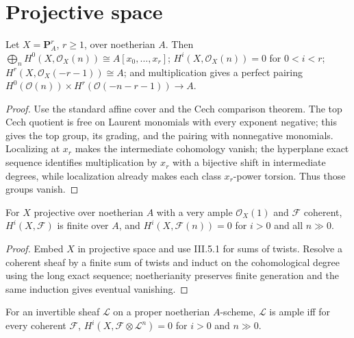 \section{Projective space}
\label{ha-ch3-sec5}
\begin{theorem}
\label{ha-ch3-thm-projective-space}
Let $X=\mathbf P_A^r$, $r\ge1$, over noetherian $A$.  Then
$\bigoplus_nH^0(X,\mathcal O_X(n))\cong A[x_0,\ldots,x_r]$;
$H^i(X,\mathcal O_X(n))=0$ for $0<i<r$; $H^r(X,\mathcal O_X(-r-1))\cong A$;
and multiplication gives a perfect pairing
$H^0(\mathcal O(n))\times H^r(\mathcal O(-n-r-1))\to A$.

\end{theorem}
\begin{proof}

Use the standard affine cover and the Cech comparison theorem.  The top
Cech quotient is free on Laurent monomials with every exponent negative;
this gives the top group, its grading, and the pairing with nonnegative
monomials.  Localizing at $x_r$ makes the intermediate cohomology vanish;
the hyperplane exact sequence identifies multiplication by $x_r$ with a
bijective shift in intermediate degrees, while localization already makes
each class $x_r$-power torsion.  Thus those groups vanish.

\end{proof}
\begin{theorem}
\label{ha-ch3-thm-serre-finiteness}
For $X$ projective over noetherian $A$ with a very ample $\mathcal O_X(1)$ and
$\mathcal F$ coherent, $H^i(X,\mathcal F)$ is finite over $A$, and
$H^i(X,\mathcal F(n))=0$ for $i>0$ and all $n\gg0$.

\end{theorem}
\begin{proof}

Embed $X$ in projective space and use III.5.1 for sums of twists.  Resolve a
coherent sheaf by a finite sum of twists and induct on the cohomological
degree using the long exact sequence; noetherianity preserves finite
generation and the same induction gives eventual vanishing.

\end{proof}
\begin{proposition}
\label{ha-ch3-prop-ample-criterion}
For an invertible sheaf $\mathcal L$ on a proper noetherian $A$-scheme,
$\mathcal L$ is ample iff for every coherent $\mathcal F$,
$H^i(X,\mathcal F\otimes\mathcal L^n)=0$ for $i>0$ and $n\gg0$.

\end{proposition}
